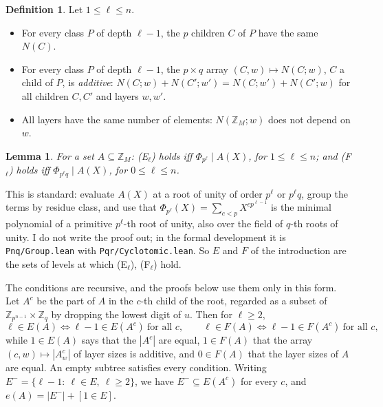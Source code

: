 \documentclass[11pt,a4paper]{amsart}
\newtheorem{lemma}[theorem]{Lemma}
\theoremstyle{definition}
\newtheorem{definition}[theorem]{Definition}
\theoremstyle{remark}
\newcommand{\Z}{\mathbb{Z}}
\newcommand{\lean}[1]{\texttt{#1}}
\begin{document}
\begin{definition}\label{def:levels}
Let $1\le\ell\le n$.
\begin{itemize}
\item[(E$_\ell$)] For every class $P$ of depth $\ell-1$, the $p$ children $C$ of $P$ have the same $N(C)$.
\item[(F$_\ell$)] For every class $P$ of depth $\ell-1$, the $p\times q$ array $(C,w)\mapsto N(C;w)$, $C$ a
child of $P$, is \emph{additive}: $N(C;w)+N(C';w')=N(C;w')+N(C';w)$ for all children $C,C'$ and layers
$w,w'$.
\item[(F$_0$)] All layers have the same number of elements: $N(\Z_M;w)$ does not depend on $w$.
\end{itemize}
\end{definition}

\begin{lemma}\label{lem:cyclo}
For a set $A\subseteq\Z_M$: {\rm (E$_\ell$)} holds iff $\Phi_{p^\ell}\mid A(X)$, for $1\le\ell\le n$; and
{\rm (F$_\ell$)} holds iff $\Phi_{p^\ell q}\mid A(X)$, for $0\le\ell\le n$.
\end{lemma}

This is standard: evaluate $A(X)$ at a root of unity of order $p^\ell$ or $p^\ell q$, group the terms by residue
class, and use that $\Phi_{p^\ell}(X)=\sum_{c<p}X^{cp^{\ell-1}}$ is the minimal polynomial of a primitive
$p^\ell$-th root of unity, also over the field of $q$-th roots of unity. I do not write the proof out; in the
formal development it is \lean{Pnq/Group.lean} with \lean{Pqr/Cyclotomic.lean}. So $E$ and $F$ of the
introduction are the sets of levels at which (E$_\ell$), (F$_\ell$) hold.

The conditions are recursive, and the proofs below use them only in this form. Let
$A^c$ be the part of $A$ in the $c$-th child of the root, regarded as a subset of
$\Z_{p^{n-1}}\times\Z_q$ by dropping the lowest digit of $u$. Then for $\ell\ge 2$,
\begin{equation}\label{eq:rec}
 \ell\in E(A)\iff \ell-1\in E(A^c)\ \text{for all } c,\qquad
 \ell\in F(A)\iff \ell-1\in F(A^c)\ \text{for all } c ,
\end{equation}
while $1\in E(A)$ says that the $|A^c|$ are equal, $1\in F(A)$ that the array $(c,w)\mapsto|A^c_w|$ of layer
sizes is additive, and $0\in F(A)$ that the layer sizes of $A$ are equal. An empty subtree satisfies every
condition. Writing $E^-=\{\ell-1:\ \ell\in E,\ \ell\ge 2\}$, we have $E^-\subseteq E(A^c)$ for every $c$, and
$e(A)=|E^-|+[1\in E]$.
\end{document}
